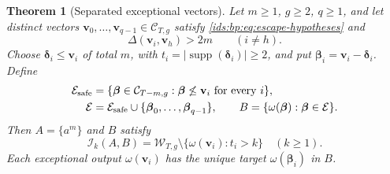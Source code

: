 \documentclass[11pt,letterpaper]{article}
\newtheorem{theorem}{Theorem}[section]
\theoremstyle{definition}\newtheorem{definition}[theorem]{Definition}
\theoremstyle{remark}\newtheorem{remark}[theorem]{Remark}
\theoremstyle{definition}\newtheorem{question}[theorem]{Question}
\newcommand{\ins}[3]{\mathcal I_{#1}(#2,#3)}
\DeclareMathOperator{\supp}{supp}
\newcommand{\bpgap}[1]{\omega(#1)}
\newcommand{\bpC}[2]{\mathcal C_{#1,#2}}
\newcommand{\bpW}[2]{\mathcal W_{#1,#2}}
\newcommand{\bpE}{\mathcal E}
\begin{document}
\begin{theorem}[Separated exceptional vectors]
\label{ids:bp:thm:geometric}
Let $m\geq1$, $g\geq2$, $q\geq1$, and let distinct vectors
$\mathbf v_0,\ldots,\mathbf v_{q-1}\in\bpC{T}{g}$ satisfy
\eqref{ids:bp:eq:escape-hypotheses} and
\begin{equation}
 \Delta(\mathbf v_i,\mathbf v_h)>2m\qquad(i\ne h).
 \label{ids:bp:eq:separation}
\end{equation}
Choose $\boldsymbol\delta_i\leq\mathbf v_i$ of total $m$, with
$t_i=|\supp(\boldsymbol\delta_i)|\geq2$, and put
$\boldsymbol\beta_i=\mathbf v_i-\boldsymbol\delta_i$.
Define
\begin{align}
 \bpE_{\rm safe}
 &=\{\boldsymbol\beta\in\bpC{T-m}{g}:
          \boldsymbol\beta\not\leq\mathbf v_i\text{ for every }i\},
 \label{ids:bp:eq:safe}\\
 \bpE&=\bpE_{\rm safe}\cup\{\boldsymbol\beta_0,\ldots,
                         \boldsymbol\beta_{q-1}\},\qquad
 B=\{\bpgap{\boldsymbol\beta}:\boldsymbol\beta\in \bpE\}.
 \label{ids:bp:eq:targets}
\end{align}
Then $A=\{a^m\}$ and $B$ satisfy
\[
 \ins{k}{A}{B}=\bpW{T}{g}\setminus
                 \{\bpgap{\mathbf v_i}:t_i>k\}
 \quad(k\geq1).
\]
Each exceptional output $\bpgap{\mathbf v_i}$ has the unique target
$\bpgap{\boldsymbol\beta_i}$ in $B$.
\end{theorem}
\end{document}
